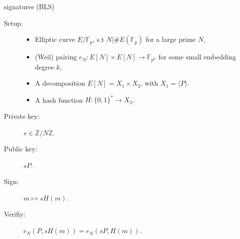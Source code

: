 \documentclass{beamer}
\newcommand{\F}{\mathbb{F}}
\begin{document}
\begin{frame}{\cite{boneh+lynn+shacham04} signatures (BLS)}
  \begin{block}{}
    \begin{description}
    \item[Setup:]
      \begin{itemize}
      \item Elliptic curve $E/\F_p$, s.t $N|\#E(\F_p)$ for a large prime $N$,
      \item (Weil) pairing $e_N:E[N]×E[N]\to\F_{p^k}$ for some
        small embedding degree $k$,
      \item A decomposition $E[N]=X_1 × X_2$, with $X_1=〈P〉$.
      \item A hash function $H:\{0,1\}^*→X_2$.
      \end{itemize}
    \item[Private key:] $s∈ℤ/Nℤ$.
    \item[Public key:] $sP$.
    \item[Sign:] $m ↦ sH(m)$.
    \item[Verifiy:] $e_N(P,sH(m)) = e_N(sP,H(m))$.
    \end{description}
  \end{block}

  \centering
\end{frame}

\end{document}
